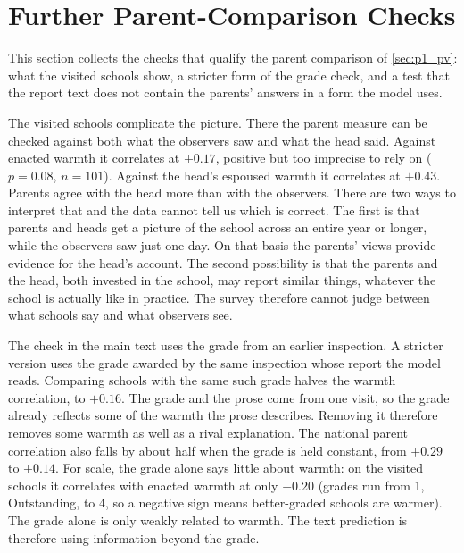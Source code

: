 



\clearpage
\section{Further Parent-Comparison Checks}
\label{sec:p1_app_parents}

This section collects the checks that qualify the parent comparison of \cref{sec:p1_pv}: what the visited schools show, a stricter form of the grade check, and a test that the report text does not contain the parents' answers in a form the model uses.

The visited schools complicate the picture. There the parent measure can be checked against both
what the observers saw and what the head said. Against enacted warmth it correlates at $+0.17$, positive but too imprecise to rely on ($p = 0.08$, $n = 101$).
Against the head's espoused warmth it correlates at $+0.43$. Parents agree with the head more than
with the observers. There are two ways to interpret that and the data cannot tell us which is
correct.
The first is that parents and heads get a picture of the school across an entire year or longer,
while the observers saw just one day. On that basis the parents' views provide evidence for the head's account. The second possibility is that the parents and the head, both invested in the school, may report similar things, whatever the school is actually like in practice. The survey therefore cannot
judge between what schools say and what observers see.

The check in the main text uses the grade from an earlier inspection. A stricter version uses the grade awarded by the same inspection whose report the model reads. Comparing schools with the same such grade halves the warmth correlation, to $+0.16$. The grade and the prose come from one visit, so the grade already reflects some of the warmth the prose describes. Removing it therefore removes some warmth as well as a rival explanation. The
national parent correlation also falls by about half when the grade is held constant,
from $+0.29$ to $+0.14$. For scale, the grade alone says little about warmth: on the
visited schools it correlates with enacted warmth at only $-0.20$ (grades run from 1,
Outstanding, to 4, so a negative sign means better-graded schools are warmer). The grade alone is only weakly related to warmth. The text prediction is therefore using information beyond the grade.

